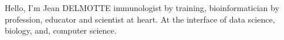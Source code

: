 

\begin{cvparagraph}

Hello, I’m Jean DELMOTTE immunologist by training, bioinformatician by profession, educator and scientist at heart. At the interface of data science, biology, and, computer science. 
\end{cvparagraph}
